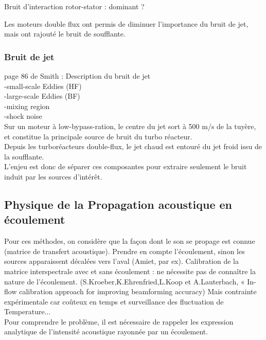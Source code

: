 Bruit d'interaction rotor-stator : dominant ?\\

Les moteurs double flux ont permis de diminuer l'importance du bruit de jet, mais ont rajouté le bruit de soufflante.


\subsubsection{Bruit de jet}

page 86 de Smith : Description du bruit de jet\\
-small-scale Eddies (HF)\\
-large-scale Eddies (BF)\\
-mixing region\\
-shock noise\\
Sur un moteur à low-bypass-ration, le centre du jet sort à 500 m/s de la tuyère, et constitue la principale source de bruit du turbo réacteur.\\
Depuis les turboréacteurs double-flux, le jet chaud est entouré du jet froid issu de la soufflante.\\


L'enjeu est donc de séparer ces composantes pour extraire seulement le bruit induit par les sources d'intérêt.





\subsection{Physique de la Propagation acoustique en écoulement}

Pour ces méthodes, on considère que la façon dont le son se propage est connue (matrice de transfert acoustique). Prendre en compte l'écoulement, sinon les sources apparaissent décalées vers l'aval (Amiet, par ex). 
Calibration de la matrice interspectrale avec et sans écoulement : ne nécessite pas de connaître la nature de l'écoulement. (S.Kroeber,K.Ehrenfried,L.Koop et A.Lauterbach, « In-flow calibration approach for improving beamforming accuracy) Mais contrainte expérimentale car coûteux en temps et surveillance des fluctuation de Temperature...\\


Pour comprendre le problème, il est nécessaire de rappeler les expression analytique de l'intensité acoustique rayonnée par un écoulement.

